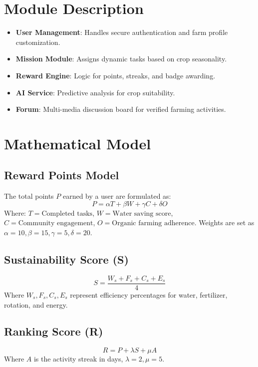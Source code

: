 \documentclass[journal]{IEEEtran}
\begin{document}
\section{Module Description}
\begin{itemize}
    \item \textbf{User Management}: Handles secure authentication and farm profile customization.
    \item \textbf{Mission Module}: Assigns dynamic tasks based on crop seasonality.
    \item \textbf{Reward Engine}: Logic for points, streaks, and badge awarding.
    \item \textbf{AI Service}: Predictive analysis for crop suitability.
    \item \textbf{Forum}: Multi-media discussion board for verified farming activities.
\end{itemize}

\section{Mathematical Model}
\subsection{Reward Points Model}
The total points $P$ earned by a user are formulated as:
\begin{equation}
P = \alpha T + \beta W + \gamma C + \delta O
\end{equation}
Where:
$T = \text{Completed tasks}$,
$W = \text{Water saving score}$,
$C = \text{Community engagement}$,
$O = \text{Organic farming adherence}$.
Weights are set as $\alpha = 10, \beta = 15, \gamma = 5, \delta = 20$.

\subsection{Sustainability Score (S)}
\begin{equation}
S = \frac{W_s + F_s + C_s + E_s}{4}
\end{equation}
Where $W_s, F_s, C_s, E_s$ represent efficiency percentages for water, fertilizer, rotation, and energy.

\subsection{Ranking Score (R)}
\begin{equation}
R = P + \lambda S + \mu A
\end{equation}
Where $A$ is the activity streak in days, $\lambda=2, \mu=5$.
\end{document}
